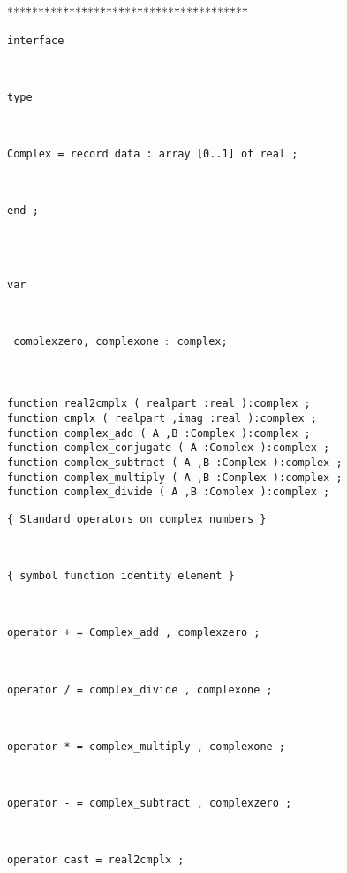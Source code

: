 \begin{tabbing}
***\=***\=***\=***\=***\=***\=***\=***\=***\=***\=***\=***\=***\=\kill
\+\parbox{14cm}{\texttt{{interface} }}\\
\+\parbox{14cm}{\texttt{{type} }}\\
\+\parbox{14cm}{\texttt{{Complex}  = {record}  {data} : {array} [0..1] {of}  {real} ;}}\\
\<\-\parbox{14cm}{\texttt{{end} ;}}\\
\\

\<\parbox{14cm}{\texttt{{var} }}\\
\parbox{14cm}{\texttt{ {complexzero}, {complexone} $:$ complex;}}\\
\\
\<\texttt{{function}  {real2cmplx} 		
{(} {realpart} :{real} ):{complex} ;} \\
\<\texttt{{function}  {cmplx} 			
{(} {realpart} ,{imag} :{real} ):{complex} ;} \\
\<\texttt{{function}  {complex\_add}          	
{(} {A} ,{B} :{Complex} ):{complex} ;} \\
\<\texttt{{function}  {complex\_conjugate}   	
{(} {A} :{Complex} ):{complex} ;} \\
\<\texttt{{function}  {complex\_subtract}  	
{(} {A} ,{B} :{Complex} ):{complex} ;} \\
\<\texttt{{function}  {complex\_multiply}  	
{(} {A} ,{B} :{Complex} ):{complex} ;} \\
\<\texttt{{function}  {complex\_divide}  	
{(} {A} ,{B} :{Complex} ):{complex} ;} \\
\parbox{14cm}{\texttt{\small{\{	Standard operators on complex numbers 	\}}}}\\
\parbox{14cm}{\texttt{\small{\{		symbol		function		identity element \}}}}\\
\parbox{14cm}{\texttt{{operator}  	+ 	= 	{Complex\_add} , 		{complexzero} ;}}\\
\parbox{14cm}{\texttt{{operator} 	/	=	{complex\_divide} ,		{complexone} ;}}\\
\parbox{14cm}{\texttt{{operator} 	*	=	{complex\_multiply} ,	{complexone} ;}}\\
\parbox{14cm}{\texttt{{operator} 	-	=	{complex\_subtract} ,	{complexzero} ;}}\\
\parbox{14cm}{\texttt{{operator} 	{cast} 	=	{real2cmplx}  ;}}\\
\\
\end{tabbing}
